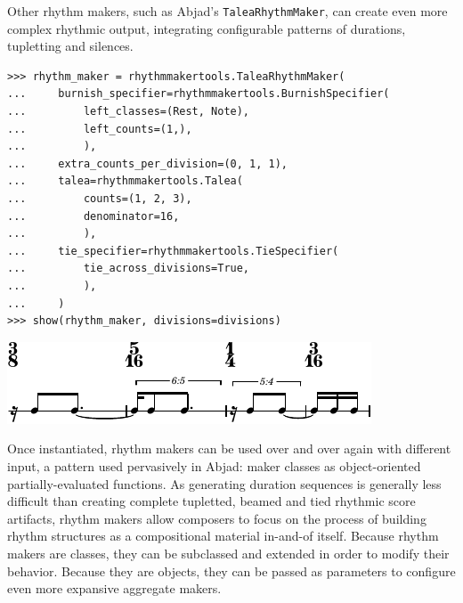 \documentclass{article}
\begin{document}
\noindent Other rhythm makers, such as Abjad's \texttt{TaleaRhythmMaker}, can create even
more complex rhythmic output, integrating configurable patterns of durations,
tupletting and silences.

\begin{lstlisting}
>>> rhythm_maker = rhythmmakertools.TaleaRhythmMaker(
...     burnish_specifier=rhythmmakertools.BurnishSpecifier(
...         left_classes=(Rest, Note),
...         left_counts=(1,),
...         ),
...     extra_counts_per_division=(0, 1, 1),
...     talea=rhythmmakertools.Talea(
...         counts=(1, 2, 3),
...         denominator=16,
...         ),
...     tie_specifier=rhythmmakertools.TieSpecifier(
...         tie_across_divisions=True,
...         ),
...     )
>>> show(rhythm_maker, divisions=divisions)
\end{lstlisting}
\includegraphics{assets/lilypond-cf8687c5463d3d6aec12827476c8fc4e.pdf}

\noindent Once instantiated, rhythm makers can be used over and over again with
different input, a pattern used pervasively in Abjad: maker classes as
object-oriented partially-evaluated functions. As generating duration sequences
is generally less difficult than creating complete tupletted, beamed and tied
rhythmic score artifacts, rhythm makers allow composers to focus on the process
of building rhythm structures as a compositional material in-and-of itself.
Because rhythm makers are classes, they can be subclassed and extended in order
to modify their behavior. Because they are objects, they can be passed as
parameters to configure even more expansive aggregate makers.
\end{document}
